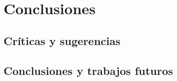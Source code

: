 %
%


\chapter{Conclusiones}

\section*{Críticas y sugerencias}

\section*{Conclusiones y trabajos futuros}
%